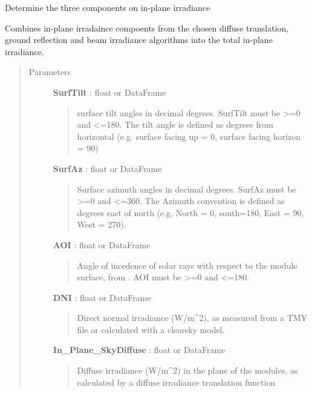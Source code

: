 \documentclass[letterpaper,10pt,english]{sphinxmanual}
\begin{document}
\begin{fulllineitems}
\label{stubs/pvlib.pvl_globalinplane:pvlib.pvl_globalinplane}
Determine the three components on in-plane irradiance

Combines in-plane irradaince compoents from the chosen diffuse translation, ground 
reflection and beam irradiance algorithms into the total in-plane irradiance.
\begin{quote}\begin{description}
\item[{Parameters}] \leavevmode
\textbf{SurfTilt} : float or DataFrame
\begin{quote}

surface tilt angles in decimal degrees.
SurfTilt must be \textgreater{}=0 and \textless{}=180. The tilt angle is defined as
degrees from horizontal (e.g. surface facing up = 0, surface facing
horizon = 90)
\end{quote}

\textbf{SurfAz} : float or DataFrame
\begin{quote}

Surface azimuth angles in decimal degrees.
SurfAz must be \textgreater{}=0 and \textless{}=360. The Azimuth convention is defined
as degrees east of north (e.g. North = 0, south=180, East = 90, West = 270).
\end{quote}

\textbf{AOI} : float or DataFrame
\begin{quote}

Angle of incedence of solar rays with respect
to the module surface, from . AOI must be \textgreater{}=0 and \textless{}=180.
\end{quote}

\textbf{DNI} : float or DataFrame
\begin{quote}

Direct normal irradiance (W/m\textasciicircum{}2), as measured 
from a TMY file or calculated with a clearsky model.
\end{quote}

\textbf{In\_Plane\_SkyDiffuse} :  float or DataFrame
\begin{quote}

Diffuse irradiance (W/m\textasciicircum{}2) in the plane of the modules, as
calculated by a diffuse irradiance translation function
\end{quote}


\end{description}
\end{quote}
\end{fulllineitems}
\end{document}
